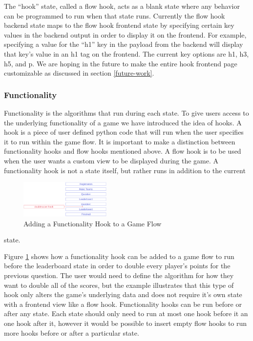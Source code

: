 \documentclass{article}
\begin{document}
            The ``hook'' state, called a flow hook, acts as a blank state where any behavior can be programmed to run when that state runs. Currently the flow hook backend state maps to the flow hook frontend state by specifying certain key values in the backend output in order to display it on the frontend. For example, specifying a value for the ``h1'' key in the payload from the backend will display that key's value in an h1 tag on the frontend. The current key options are h1, h3, h5, and p. We are hoping in the future to make the entire hook frontend page customizable as discussed in section \ref{future-work}.
        
        \subsubsection{Functionality}\label{functionality}
            Functionality is the algorithms that run during each state. To give users access to the underlying functionality of a game we have introduced the idea of hooks. A hook is a piece of user defined python code that will run when the user specifies it to run within the game flow. It is important to make a distinction between functionality hooks and flow hooks mentioned above. A flow hook is to be used when the user wants a custom view to be displayed during the game. A functionality hook is not a state itself, but rather runs in addition to the current
            \begin{figure}
                \centering
                \includegraphics[width=0.40\textwidth]{images/architecture-hook.png}
                \caption{Adding a Functionality Hook to a Game Flow}
                \label{fig:functionality-hook}
            \end{figure}
            state.
            
            Figure \ref{fig:functionality-hook} shows how a functionality hook can be added to a game flow to run before the leaderboard state in order to double every player's points for the previous question. The user would need to define the algorithm for how they want to double all of the scores, but the example illustrates that this type of hook only alters the game's underlying data and does not require it's own state with a frontend view like a flow hook. Functionality hooks can be run before or after any state. Each state should only need to run at most one hook before it an one hook after it, however it would be possible to insert empty flow hooks to run more hooks before or after a particular state.
\end{document}
